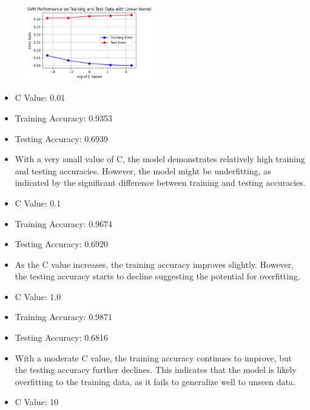 \documentclass[a4paper,10 pt]{article}
\begin{document}
    \vspace{12pt}

  
    \begin{figure}[H]
      \centering
      \includegraphics[width=0.5\textwidth]{graphQ5arr.png} %
    \end{figure}
      
    \vspace{12pt}

    \begin{itemize}
      
    \item C Value: 0.01

    \item[] Training Accuracy: 0.9353
    \item[] Testing Accuracy: 0.6939
    \item[] With a very small value of C, the model demonstrates relatively high training and testing accuracies. However, the model might be underfitting, as indicated by the significant difference between training and testing accuracies.
    
    \item C Value: 0.1
    \item[]Training Accuracy: 0.9674
    \item[] Testing Accuracy: 0.6920
    \item[] As the C value increases, the training accuracy improves slightly. However, the testing accuracy starts to decline suggesting the potential for overfitting.
    
    \item C Value: 1.0
    \item[] Training Accuracy: 0.9871
    \item[] Testing Accuracy: 0.6816
    \item[] With a moderate C value, the training accuracy continues to improve, but the testing accuracy further declines. This indicates that the model is likely overfitting to the training data, as it fails to generalize well to unseen data.
    
    \item C Value: 10
    

\end{itemize}
\end{document}
